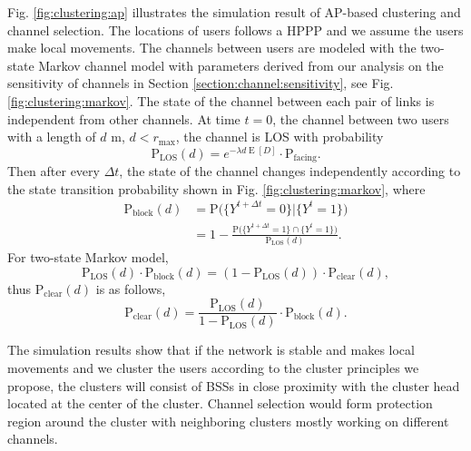 \documentclass[10pt, conference, letterpaper]{IEEEtran}
\DeclareMathOperator*{\E}{\mathrm{E}}
\DeclareMathOperator*{\LOS}{\mathrm{LOS}}
\begin{document}
Fig. \ref{fig:clustering:ap} illustrates the simulation result of AP-based clustering and channel selection. The locations of users follows a HPPP and we assume the users make local movements. The channels between users are modeled with the two-state Markov channel model \cite{timevaryingpathshadowing} with parameters derived from our analysis on the sensitivity of channels in Section \ref{section:channel:sensitivity}, see Fig. \ref{fig:clustering:markov}. The state of the channel between each pair of links is independent from other channels. At time $t = 0$, the channel between two users with a length of $d$ m, $d<r_{\max}$, the channel is LOS with probability 
\begin{equation*}
\mathrm{P}_{\mathrm{LOS}}(d) = e^{-\lambda d \E[D]}\cdot \mathrm{P}_{\mathrm{facing}}.
\end{equation*}
Then after every $\Delta t$, the state of the channel changes independently according to the state transition probability shown in Fig. \ref{fig:clustering:markov}, where
\begin{equation*}
\begin{aligned}
\mathrm{P}_{\mathrm{block}}(d) & = \mathrm{P}\big(\{Y^{t+\Delta t} = 0\}|\{Y^{t} = 1\}\big) \\
& = 1 - \frac{\mathrm{P}\big(\{Y^{t+\Delta t} = 1\}\cap\{Y^{t} = 1\}\big)}{\mathrm{P}_{\LOS}(d)}.
\end{aligned}
\end{equation*}
For two-state Markov model, 
\begin{equation*}
\mathrm{P}_{\LOS}(d)\cdot \mathrm{P}_{\mathrm{block}}(d) = (1 - \mathrm{P}_{\LOS}(d)) \cdot \mathrm{P_{clear}}(d),
\end{equation*}
thus $\mathrm{P_{clear}}(d)$ is as follows,
\begin{equation*}
\mathrm{P_{clear}}(d) = \frac{\mathrm{P_{LOS}}(d)}{1 - \mathrm{P_{LOS}}(d)}\cdot\mathrm{P_{block}}(d).
\end{equation*}

The simulation results show that if the network is stable and makes local movements and we cluster the users according to the cluster principles we propose, the clusters will consist of BSSs in close proximity with the cluster head located at the center of the cluster. Channel selection would form protection region around the cluster with neighboring clusters mostly working on different channels.
\end{document}
